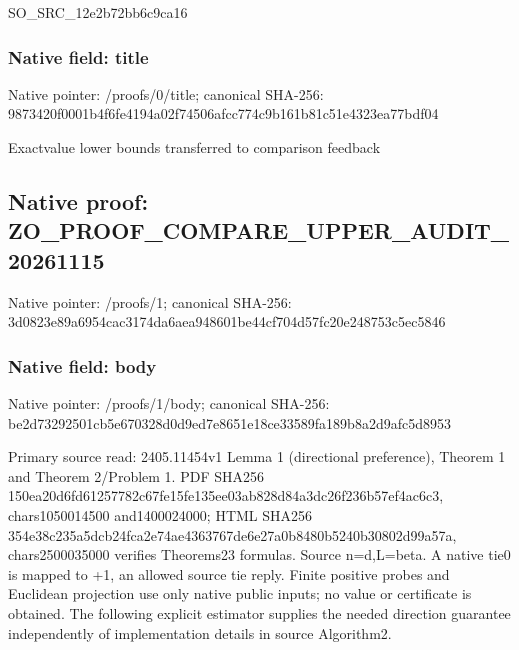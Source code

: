 \documentclass[10pt,a4paper]{article}
\begin{document}
SO\_SRC\_12e2b72bb6c9ca16


\subsubsection{Native field: title}


Native pointer: /proofs/0/title; canonical SHA-256: 9873420f0001b4f6fe4194a0\allowbreak{}2f74506afcc774c9b161b81c\allowbreak{}51e4323ea77bdf04


Exactvalue lower bounds transferred to comparison feedback


\subsection{Native proof: ZO\_PROOF\_COMPARE\_UPPER\_AUDIT\_20261115}


Native pointer: /proofs/1; canonical SHA-256: 3d0823e89a6954cac3174da6\allowbreak{}aea948601be44cf704d57fc2\allowbreak{}0e248753c5ec5846



\subsubsection{Native field: body}


Native pointer: /proofs/1/body; canonical SHA-256: be2d73292501cb5e670328d0\allowbreak{}d9ed7e8651e18ce33589fa18\allowbreak{}9b8a2d9afc5d8953


Primary source read: 2405.11454v1 Lemma 1 (directional preference), Theorem 1 and Theorem 2/Problem 1. PDF SHA256 150ea20d6fd61257782c67fe\allowbreak{}15fe135ee03ab828d84a3dc2\allowbreak{}6f236b57ef4ac6c3, chars1050014500 and1400024000; HTML SHA256 354e38c235a5dcb24fca2e74\allowbreak{}ae4363767de6e27a0b8480b5\allowbreak{}240b30802d99a57a, chars2500035000 verifies Theorems23 formulas. Source n=d,L=beta. A native tie0 is mapped to +1, an allowed source tie reply. Finite positive probes and Euclidean projection use only native public inputs; no value or certificate is obtained. The following explicit estimator supplies the needed direction guarantee independently of implementation details in source Algorithm2.
\end{document}
